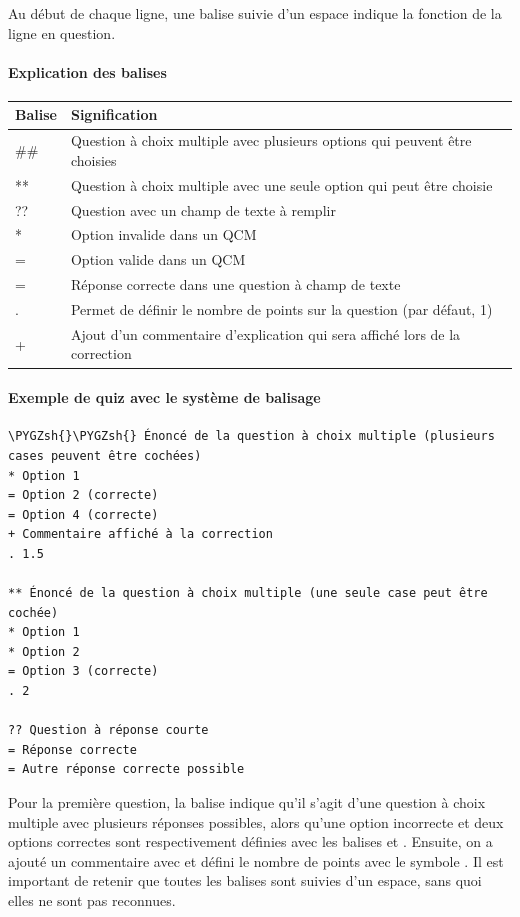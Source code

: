 \documentclass[a4,10pt,french]{sphinxmanual}
\def\PYGZsh{\char`\#}
\begin{document}
Au début de chaque ligne, une balise suivie d'un espace indique la fonction de la ligne en question.


\paragraph{Explication des balises}
\label{doc-user:explication-des-balises}
\begin{tabulary}{\linewidth}{|L|L|}
\hline
\textsf{\relax 
Balise
} & \textsf{\relax 
Signification
}\\
\hline
\#\#
 & 
Question à choix multiple avec plusieurs options qui peuvent être choisies
\\
\hline
**
 & 
Question à choix multiple avec une seule option qui peut être choisie
\\
\hline
??
 & 
Question avec un champ de texte à remplir
\\
\hline
*
 & 
Option invalide dans un QCM
\\
\hline
=
 & 
Option valide dans un QCM
\\
\hline
=
 & 
Réponse correcte dans une question à champ de texte
\\
\hline
.
 & 
Permet de définir le nombre de points sur la question (par défaut, 1)
\\
\hline
+
 & 
Ajout d'un commentaire d'explication qui sera affiché lors de la correction
\\
\hline\end{tabulary}



\paragraph{Exemple de quiz avec le système de balisage}
\label{doc-user:exemple-de-quiz-avec-le-systeme-de-balisage}
\begin{Verbatim}[commandchars=\\\{\}]
\PYGZsh{}\PYGZsh{} Énoncé de la question à choix multiple (plusieurs cases peuvent être cochées)
* Option 1
= Option 2 (correcte)
= Option 4 (correcte)
+ Commentaire affiché à la correction
. 1.5

** Énoncé de la question à choix multiple (une seule case peut être cochée)
* Option 1
* Option 2
= Option 3 (correcte)
. 2

?? Question à réponse courte
= Réponse correcte
= Autre réponse correcte possible
\end{Verbatim}

Pour la première question, la balise \code{\#\#} indique qu'il s'agit d'une question à choix multiple avec plusieurs réponses possibles, alors qu'une option incorrecte et deux options correctes sont respectivement définies avec les balises \code{*} et \code{=}. Ensuite, on a ajouté un commentaire avec \code{+} et défini le nombre de points avec le symbole . Il est important de retenir que toutes les balises sont suivies d'un espace, sans quoi elles ne sont pas reconnues.
\end{document}
